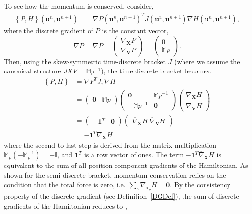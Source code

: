 \documentclass[preprint,12pt]{elsarticle}
\theoremstyle{definition}
\begin{document}
To see how the momentum is conserved, consider,
\begin{align*}
\left\{ P,H \right\} \left(\boldsymbol{u}^n,\boldsymbol{u}^{n+1}\right) &= \overline{\nabla} P\left(\boldsymbol{u}^n,\boldsymbol{u}^{n+1}\right)^T \bar{J}\left(\boldsymbol{u}^n,\boldsymbol{u}^{n+1}\right) \overline{\nabla} H \left(\boldsymbol{u}^n,\boldsymbol{u}^{n+1}\right),
\end{align*}
where the discrete gradient of $P$ is the constant vector,
\begin{equation*}
    \overline{\nabla} P = \nabla P = \begin{pmatrix} \nabla_{\boldsymbol{X}} P \\ \nabla_{\boldsymbol{V}} P    \end{pmatrix} = \begin{pmatrix} 0 \\ \mathbb{M}p \end{pmatrix}.
\end{equation*}
Then, using the skew-symmetric time-discrete bracket $\bar{J}$ (where we assume the canonical structure $\bar{J}{XV} = \mathbb{M}p^{-1}$), the time discrete bracket becomes:
\begin{align*}
    \left\{ P,H \right\} &= \overline{\nabla} P^T \bar{J} , \overline{\nabla} H \\
    &= \begin{pmatrix} \mathbf{0} & \mathbb{M}p \end{pmatrix} \begin{pmatrix} \mathbf{0} & \mathbb{M}p^{-1} \\ - \mathbb{M}p^{-1} & \mathbf{0} \end{pmatrix} \begin{pmatrix} \overline{\nabla}_{\boldsymbol{X}} H \\ \overline{\nabla}_{\boldsymbol{V}} H \end{pmatrix} \\
    &= \begin{pmatrix} - \mathbf{1}^T & \mathbf{0} \end{pmatrix} \begin{pmatrix} \overline{\nabla}_{\boldsymbol{X}} H \ \overline{\nabla}_{\boldsymbol{V}} H \end{pmatrix} \\
    &= - \mathbf{1}^T \overline{\nabla}_{\boldsymbol{X}} H
\end{align*}
where the second-to-last step is derived from the matrix multiplication $\mathbb{M}_p (- \mathbb{M}_p^{-1}) = - \mathbb{I}$, and $\mathbf{1}^T$ is a row vector of ones. The term $-\mathbf{1}^T \overline{\nabla}_{\boldsymbol{X}} H$ is equivalent to the sum of all position-component gradients of the Hamiltonian. As shown for the semi-discrete bracket, momentum conservation relies on the condition that the total force is zero, i.e. $\sum_p \nabla_{\boldsymbol{x}_p} H = \mathbf{0}$. By the consistency property of the discrete gradient (see Definition~\ref{DGDef}), the sum of discrete gradients of the Hamiltonian reduces to ,
\end{document}
